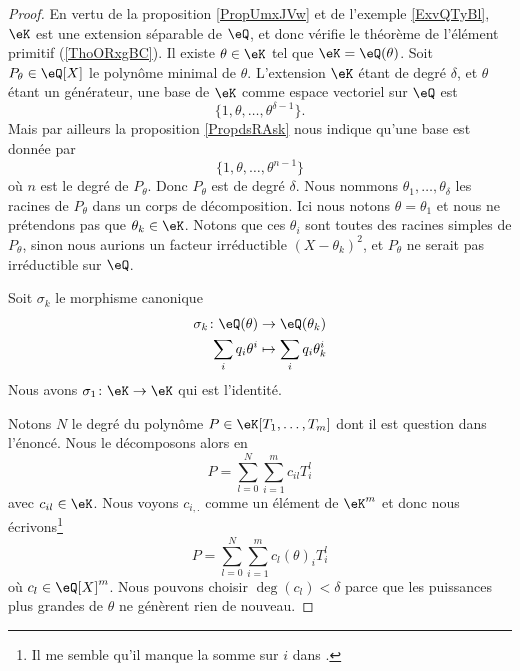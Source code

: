 \begin{proof}
    En vertu de la proposition \ref{PropUmxJVw} et de l'exemple \ref{ExvQTyBl}, \( \eK\) est une extension séparable de \( \eQ\), et donc vérifie le théorème de l'élément primitif (\ref{ThoORxgBC}). Il existe \( \theta\in \eK\) tel que \( \eK=\eQ(\theta)\). Soit \( P_{\theta}\in\eQ[X]\) le polynôme minimal de \( \theta\). L'extension \( \eK\) étant de degré \( \delta\), et \( \theta\) étant un générateur, une base de \( \eK\) comme espace vectoriel sur \( \eQ\) est 
    \begin{equation}
        \{ 1,\theta,\ldots, \theta^{\delta-1} \}.
    \end{equation}
    Mais par ailleurs la proposition \ref{PropdsRAsk} nous indique qu'une base est donnée par
    \begin{equation}
        \{ 1,\theta,\ldots, \theta^{n-1} \}
    \end{equation}
    où \( n\) est le degré de \( P_{\theta}\). Donc \( P_{\theta}\) est de degré \( \delta\). Nous nommons \( \theta_1,\ldots, \theta_{\delta}\) les racines de \( P_{\theta}\) dans un corps de décomposition. Ici nous notons \( \theta=\theta_1\) et nous ne prétendons pas que \( \theta_k\in \eK\). Notons que ces \( \theta_i\) sont toutes des racines simples de \( P_{\theta}\), sinon nous aurions un facteur irréductible \( (X-\theta_k)^2\), et \( P_{\theta}\) ne serait pas irréductible sur \( \eQ\).

    Soit \( \sigma_k\) le morphisme canonique
    \begin{equation}
        \begin{aligned}
            \sigma_k\colon \eQ(\theta)&\to \eQ(\theta_k) \\
            \sum_i q_i\theta^i&\mapsto \sum_iq_i\theta_k^i 
        \end{aligned}
    \end{equation}
    Nous avons \( \sigma_1\colon \eK\to \eK\) qui est l'identité.

    Notons \( N\) le degré du polynôme \( P\in \eK[T_1,\ldots, T_m]\) dont il est question dans l'énoncé. Nous le décomposons alors en
    \begin{equation}
        P=\sum_{l=0}^N\sum_{i=1}^mc_{il}T_i^l
    \end{equation}
    avec \( c_{il}\in \eK\). Nous voyons \( c_{i,.}\) comme un élément de \( \eK^m\) et donc nous écrivons\footnote{Il me semble qu'il manque la somme sur \( i\) dans \cite{fJhCTE}.}
    \begin{equation}
        P=\sum_{l=0}^N\sum_{i=1}^m c_l(\theta)_iT_i^l
    \end{equation}
    où \( c_l\in \eQ[X]^m\). Nous pouvons choisir \( \deg(c_l)<\delta\) parce que les puissances plus grandes de \( \theta\) ne génèrent rien de nouveau.


\end{proof}
